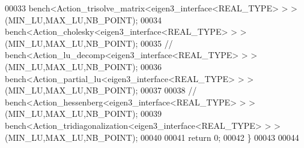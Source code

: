 \begin{DoxyCode}
00033   bench<Action\_trisolve\_matrix<eigen3\_interface<REAL\_TYPE> > >(MIN\_LU,MAX\_LU,NB\_POINT);
00034   bench<Action\_cholesky<eigen3\_interface<REAL\_TYPE> > >(MIN\_LU,MAX\_LU,NB\_POINT);
00035 \textcolor{comment}{//   bench<Action\_lu\_decomp<eigen3\_interface<REAL\_TYPE> > >(MIN\_LU,MAX\_LU,NB\_POINT);}
00036   bench<Action\_partial\_lu<eigen3\_interface<REAL\_TYPE> > >(MIN\_LU,MAX\_LU,NB\_POINT);
00037 
00038 \textcolor{comment}{//   bench<Action\_hessenberg<eigen3\_interface<REAL\_TYPE> > >(MIN\_LU,MAX\_LU,NB\_POINT);}
00039   bench<Action\_tridiagonalization<eigen3\_interface<REAL\_TYPE> > >(MIN\_LU,MAX\_LU,NB\_POINT);
00040 
00041   \textcolor{keywordflow}{return} 0;
00042 \}
00043 
00044 
\end{DoxyCode}
